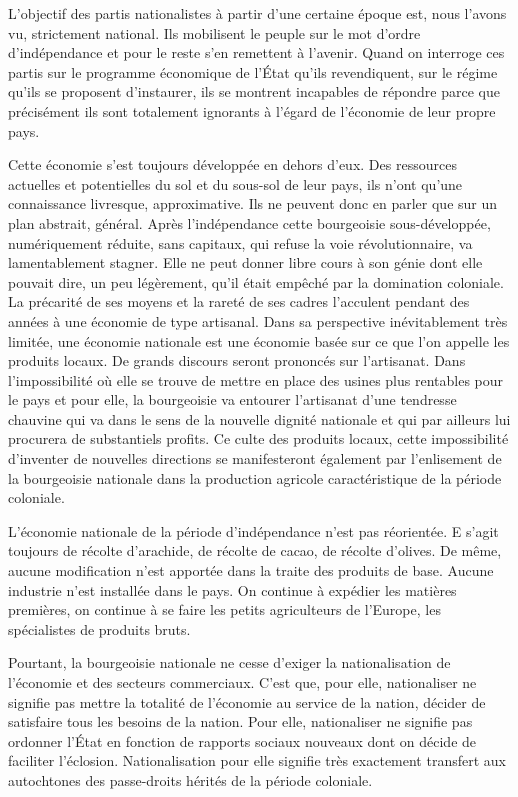 \documentclass[french,twoside]{book} %
\begin{document}
\bigbreak
\noindent L’objectif des partis nationalistes à partir d’une certaine époque est, nous l’avons vu, strictement national. Ils mobilisent le peuple sur le mot d’ordre d’indépendance et pour le reste s’en remettent à l’avenir. Quand on interroge ces partis sur le programme économique de l’État qu’ils revendiquent, sur le régime qu’ils se proposent d’instaurer, ils se montrent incapables de répondre parce que précisément ils sont totalement ignorants à l’égard de l’économie de leur propre pays.\par
Cette économie s’est toujours développée en dehors d’eux. Des ressources actuelles et potentielles du sol et du sous-sol de leur pays, ils n’ont qu’une connaissance livresque, approximative. Ils ne peuvent donc en parler que sur un plan abstrait, général. Après l’indépendance cette bourgeoisie sous-développée, numériquement réduite, sans capitaux, qui refuse la voie révolutionnaire, va lamentablement stagner. Elle ne peut donner libre cours à son génie dont elle pouvait dire, un peu légèrement, qu’il était empêché par la domination coloniale. La précarité de ses moyens et la rareté de ses cadres l’acculent pendant des années à une économie de type artisanal. Dans sa perspective inévitablement très limitée, une économie nationale est une économie basée sur ce que l’on appelle les produits locaux. De grands discours seront prononcés sur l’artisanat. Dans l’impossibilité où elle se trouve de mettre en place des usines plus rentables pour le pays et pour elle, la bourgeoisie va entourer   l’artisanat d’une tendresse chauvine qui va dans le sens de la nouvelle dignité nationale et qui par ailleurs lui procurera de substantiels profits. Ce culte des produits locaux, cette impossibilité d’inventer de nouvelles directions se manifesteront également par l’enlisement de la bourgeoisie nationale dans la production agricole caractéristique de la période coloniale.\par
L’économie nationale de la période d’indépendance n’est pas réorientée. E s’agit toujours de récolte d’arachide, de récolte de cacao, de récolte d’olives. De même, aucune modification n’est apportée dans la traite des produits de base. Aucune industrie n’est installée dans le pays. On continue à expédier les matières premières, on continue à se faire les petits agriculteurs de l’Europe, les spécialistes de produits bruts.\par
\bigbreak
\noindent Pourtant, la bourgeoisie nationale ne cesse d’exiger la nationalisation de l’économie et des secteurs commerciaux. C’est que, pour elle, nationaliser ne signifie pas mettre la totalité de l’économie au service de la nation, décider de satisfaire tous les besoins de la nation. Pour elle, nationaliser ne signifie pas ordonner l’État en fonction de rapports sociaux nouveaux dont on décide de faciliter l’éclosion. Nationalisation pour elle signifie très exactement transfert aux autochtones des passe-droits hérités de la période coloniale.\par
\end{document}
